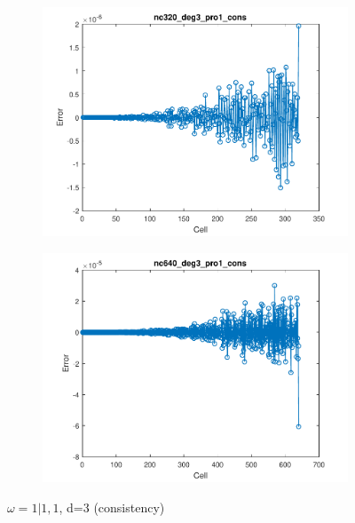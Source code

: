 \documentclass[11pt,a4paper]{article}
\theoremstyle{plain}
\theoremstyle{definition}
\begin{document}
\begin{figure}[H]
\medskip
\begin{subfigure}[b]{0.48\textwidth}
\includegraphics[width=\linewidth]{../../tests_01_01/test_01_01_test47_pro1_cons/output/plots/nc320_deg3_wei111_pro1_cons.pdf}
\end{subfigure}\hspace*{\fill}
\begin{subfigure}[b]{0.48\textwidth}
\includegraphics[width=\linewidth]{../../tests_01_01/test_01_01_test47_pro1_cons/output/plots/nc640_deg3_wei111_pro1_cons.pdf}
\end{subfigure}

\caption{$\omega=1|1,1$, d=3 (consistency)}
\end{figure}
\end{document}

